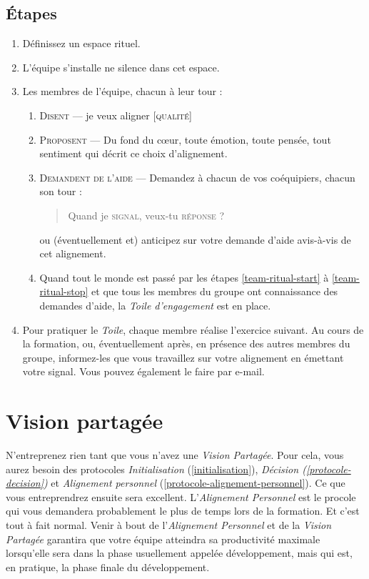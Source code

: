 \documentclass[paper=6in:9in,pagesize=pdftex,headinclude=on,footinclude=on,11pt]{scrbook}
\newcommand*{\numref}[1]{{\hyperref[{#1}]{\autoref*{#1}}}}
\let\oldsection\section
\renewcommand\section{\clearpage\oldsection}
\begin{document}
\subsection{Étapes}
\begin{enumerate}
	\item Définissez un espace rituel.
	\item L'équipe s'installe ne silence dans cet espace.
	\item Les membres de l'équipe, chacun à leur tour :
	      \begin{enumerate}
	      	\item \label{team-ritual-start} \textsc{Disent} --- \og{}je veux aligner [\textsc{qualité}]\fg{}
	      	\item \textsc{Proposent} --- Du fond du cœur, toute émotion, toute pensée, tout sentiment qui décrit ce choix d'alignement.
	      	\item \label{team-ritual-stop} \textsc{Demandent de l'aide} --- Demandez à chacun de vos coéquipiers, chacun son tour :
	      	      \begin{quote}
	      	      	\og{}Quand je \textsc{signal}, veux-tu \textsc{réponse} ?\fg{}
	      	      \end{quote}
	      	      ou (éventuellement et) anticipez sur votre demande d'aide avis-à-vis de cet alignement.
			\item Quand tout le monde est passé par les étapes \ref{team-ritual-start} à \ref{team-ritual-stop} et que tous les membres
			      du groupe ont connaissance des demandes d'aide, la \emph{Toile d'engagement} est en place.
	      \end{enumerate}
	\item Pour pratiquer le \emph{Toile}, chaque membre réalise l'exercice suivant. Au cours de la formation, ou, éventuellement après,
	      en présence des autres membres du groupe, informez-les que vous travaillez sur votre alignement en émettant votre signal.
	      Vous pouvez également le faire par e-mail.
\end{enumerate}

\section{Vision partagée} \label{vision-partagee}

N'entreprenez rien tant que vous n'avez une \emph{Vision Partagée}. Pour cela, vous aurez besoin des protocoles \emph{Initialisation}
(\numref{initialisation}), \emph{Décision (\numref{protocole-decision})} et \emph{Alignement personnel} (\numref{protocole-alignement-personnel}).
Ce que vous entreprendrez ensuite sera excellent. L'\emph{Alignement Personnel} est le procole qui vous demandera probablement le plus de
temps lors de la formation. Et c'est tout à fait normal. Venir à bout de l'\emph{Alignement Personnel} et de la \emph{Vision Partagée}
garantira que votre équipe atteindra sa productivité maximale lorsqu'elle sera dans la phase usuellement appelée \og{}développement\fg{},
mais qui est, en pratique, la phase finale du développement.
\end{document}
